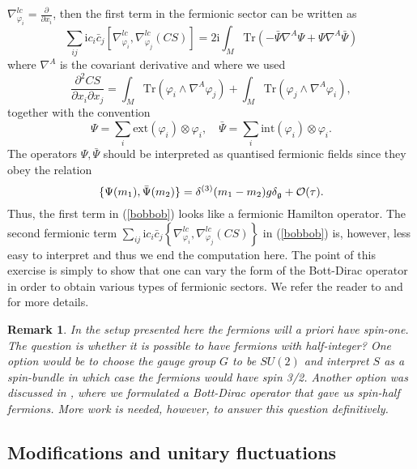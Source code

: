 \documentclass[letterpaper,11pt]{article}
\def\d{\delta}
\def\co{{\cal O}}
\newcommand{\pa}{\partial}
\newtheorem{remark}{Remark}
\begin{document}
$
\nabla^{lc}_{\varphi_i} = \frac{\pa}{\pa x_i}
$,
then the first term in the fermionic sector can be written as
$$
\sum_{ij} \mathrm{i} c_i \bar{c}_j \left[\nabla^{lc}_{\varphi_i}, \nabla^{lc}_{\varphi_j}(CS)\right]=2\mathrm{i}\int_M \mbox{Tr}\left(-\bar{\Psi}\nabla^A \Psi + \Psi \nabla^A \bar{\Psi} \right)
$$
where $\nabla^A$ is the covariant derivative and where we used
$$
 \frac{\pa^2 CS}{\pa x_{i } \pa x_{j }} 
 =    \int_M \mbox{Tr} \left(  \varphi_{i  }  \wedge \nabla^A  \varphi_{j} \right) + \int_M \mbox{Tr} \left(  \varphi_{j  }  \wedge \nabla^A  \varphi_{i} \right)   ,   
$$
together with the convention
$$
\Psi = \sum_i \mbox{ext}(\varphi_i)\otimes \varphi_i , \quad \bar{\Psi} = \sum_i \mbox{int}(\varphi_i)\otimes \varphi_i .
$$
The operators $\Psi, \bar{\Psi}$ should be interpreted as quantised fermionic fields since they obey the relation
$$
\{\Psi(m_1), \bar{\Psi}(m_2)\} = \d^{(3)}(m_1-m_2)g \d_{\mathfrak{g}} + \co(\tau).
$$
Thus, the first term in (\ref{bobbob}) looks like a fermionic Hamilton operator.
The second fermionic term 
$ \sum_{ij} \mathrm{i} c_i \bar{c}_j   \left\{\nabla^{lc}_{\varphi_i}, \nabla^{lc}_{\varphi_j}(CS)\right\} $ in (\ref{bobbob}) is, however, less easy to interpret and thus we end the computation here. The point of this exercise is simply to show that one can vary the form of the Bott-Dirac operator in order to obtain various types of fermionic sectors. We refer the reader to \cite{Aastrup:2020jcf} and \cite{Aastrup:2017atr} for more details.





\begin{remark}
In the setup presented here the fermions will a priori have spin-one. The question is whether it is possible to have fermions with half-integer? One option would be to choose the gauge group $G$ to be $SU(2)$ and interpret $S$ as a spin-bundle in which case the fermions would have spin 3/2. Another option was discussed in \cite{Aastrup:2020jcf}, where we formulated a Bott-Dirac operator that gave us spin-half fermions. More work is needed, however, to answer this question definitively.
\end{remark}










\subsection{Modifications and unitary fluctuations}
\end{document}
